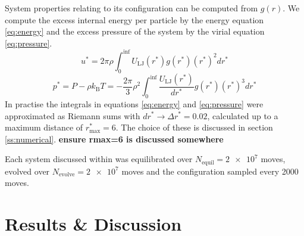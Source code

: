 \documentclass[10pt, twocolumn]{revtex4}    %
\begin{document}
System properties relating to its configuration can be computed from $g(r)$. We compute the excess internal energy per particle by the energy equation \ref{eq:energy} and the excess pressure of the system by the virial equation \ref{eq:pressure}.
\begin{equation}
u^{*} = 2\pi{}\rho{}\int_{0}^{\inf}U_\text{LJ}(r^{*})g(r^{*})(r^{*})^{2}dr^{*}
\label{eq:energy}
\end{equation}
\begin{equation}
p^{*} = P - \rho{}k_\text{B}T = - \frac{2\pi}{3}\rho{}^{2} \int_{0}^{\inf}\frac{U_\text{LJ}(r^{*})}{dr^{*}}g(r^{*})(r^{*})^{3}dr^{*}
\label{eq:pressure}
\end{equation}
In practise the integrals in equations \ref{eq:energy} and \ref{eq:pressure} were approximated as Riemann sums with $dr^{*} \rightarrow{} \Delta{}r^{*} = 0.02$, calculated up to a maximum distance of $r_\text{max}^{*}=6$. The choice of these is discussed in section \ref{ss:numerical}. \textbf{ensure rmax=6 is discussed somewhere}

Each system discussed within was equilibrated over $N_\text{equil}=\num{2e7}$ moves, evolved over $N_\text{evolve}=\num{2e7}$ moves and the configuration sampled every \num{2000} moves.



\section{Results \& Discussion} \label{s:results}

\end{document}
